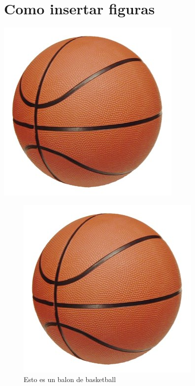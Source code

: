 \section{Como insertar figuras}

\begin{center}
    \includegraphics[scale=0.5]{imgs/basket/pelota.jpeg}
\end{center}


\begin{figure}[h]
    \begin{flushright}
        \includegraphics[scale=0.5]{imgs/basket/pelota.jpeg}
        \caption{Esto es un balon de basketball}
        \label{basket}
    \end{flushright}
\end{figure}

